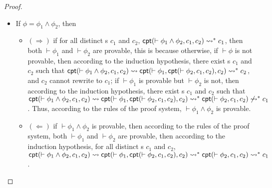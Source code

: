 \begin{proof}
\begin{itemize}
		\item If $\phi = \phi_1\wedge \phi_2$, then
		\begin{itemize}
			\item $(\Rightarrow)$ if for all distinct \CPT{}s $c_1$ and $c_2$, $\textsf{cpt}(\vdash\phi_1\wedge\phi_2, c_1, c_2)\rightsquigarrow^* c_1$, then both $\vdash\phi_1$ and $\vdash\phi_2$ are provable, this is because otherwise, if $\vdash\phi$ is not provable, then according to the induction hypothesis, there exist \CPT{}s $c_1$ and $c_2$ such that 
			$\textsf{cpt}(\vdash
			\phi_1\wedge\phi_2, c_1, c_2)\rightsquigarrow \textsf{cpt}(\vdash \phi_1, \textsf{cpt}(\vdash
			\phi_2, c_1, c_2), c_2)\rightsquigarrow^*c_2$, and $c_2$ cannot rewrite to $c_1$; if $\vdash\phi_1$ is provable but $\vdash\phi_2$ is not, then according to the induction hypothesis, there exist \CPT{}s $c_1$ and $c_2$ such that $\textsf{cpt}(\vdash
			\phi_1\wedge\phi_2, c_1, c_2)\rightsquigarrow \textsf{cpt}(\vdash \phi_1, \textsf{cpt}(\vdash
			\phi_2, c_1, c_2), c_2)\rightsquigarrow^*\textsf{cpt}(\vdash
			\phi_2, c_1, c_2)\not\rightsquigarrow^*c_1$. Thus, according to the rules of the proof system, $\vdash\phi_1\wedge\phi_2$ is provable.
			\item $(\Leftarrow)$ if $\vdash\phi_1\wedge\phi_2$ is provable, then according to the rules of the proof system, both $\vdash\phi_1$ and $\vdash\phi_2$ are provable, then according to the induction hypothesis, for all distinct \CPT{}s $c_1$ and $c_2$, $\textsf{cpt}(\vdash
			\phi_1\wedge\phi_2, c_1, c_2)\rightsquigarrow \textsf{cpt}(\vdash \phi_1, \textsf{cpt}(\vdash
			\phi_2, c_1, c_2), c_2) \rightsquigarrow^* \textsf{cpt}(\vdash \phi_2, c_1, c_2)\rightsquigarrow^*
			c_1$.
		\end{itemize}
		

\end{itemize}
\end{proof}
